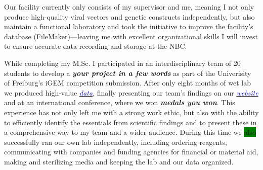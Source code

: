 \documentclass[11pt,a4paper,sans]{moderncv}
\begin{document}
\begin{spacing}{1.15}
Our facility currently only consists of my supervisor and me, meaning I not only produce high-quality viral vectors and genetic constructs independently, but also maintain a functional laboratory and took the initiative to improve the facility's database (FileMaker)---leaving me with excellent organizational skills I will invest to ensure accurate data recording and storage at the NBC.

While completing my M.Sc. I participated in an interdisciplinary team of 20 students to develop a \textbf{\emph{your project in a few words}} as part of the Univerisity of Freiburg's iGEM competition submission.
After only eight months of wet lab we produced high-value  {\href{https://www.ncbi.nlm.nih.gov/pubmed/29803867}{\textcolor{blue}{\textit{data}}}}, finally presenting our team's findings on our {\href{http://2015.igem.org/Team:Freiburg}{\textcolor{blue}{\textit{website}}}} and at an international conference, where we won \textbf{\emph{medals you won}}.
This experience has not only left me with a strong work ethic, but also with the ability to efficiently identify the essentials from scientific findings and to present these in a comprehensive way to my team and a wider audience. %
During this time we \colorbox{green}{also} successfully ran our own lab independently, including ordering reagents, communicating with companies and funding agencies for financial or material aid, making and sterilizing media and keeping the lab and our data organized. \par%


\end{spacing}
\end{document}
